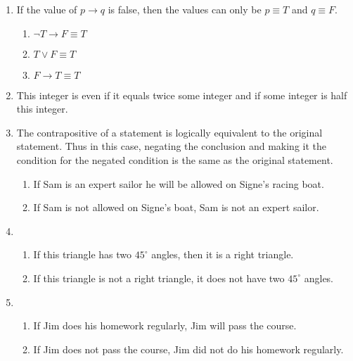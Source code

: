 \documentclass[12pt]{article}
\begin{document}
\begin{enumerate}
\begin{enumerate}
  \end{enumerate}

\setcounter{enumi}{20} %
\item
  If the value of $p \rightarrow q$ is false, then the values can only be $p \equiv T$ and $q \equiv F$.
  \begin{enumerate}
  \item $\neg T \rightarrow F \equiv T$
  \item $T \vee F \equiv T$
  \item $F \rightarrow T \equiv T$
  \end{enumerate}

\setcounter{enumi}{32} %
\item This integer is even if it equals twice some integer and if some integer is half this integer.
\setcounter{enumi}{34} %
\item
The contrapositive of a statement is logically equivalent to the original statement. Thus in this case, negating the conclusion and making it the condition for the negated condition is the same as the original statement.
  \begin{enumerate}
  \item If Sam is an expert sailor he will be allowed on Signe's racing boat.
  \item If Sam is not allowed on Signe's boat, Sam is not an expert sailor.
  \end{enumerate}

\setcounter{enumi}{40} %
\item
\begin{enumerate}
\item If this triangle has two $45^{\circ}$ angles, then it is a right triangle.
\item If this triangle is not a right triangle, it does not have two $45^{\circ}$ angles.
\end{enumerate}
\setcounter{enumi}{42} %
\item 

\begin{enumerate}
\item If Jim does his homework regularly, Jim will pass the course.
\item If Jim does not pass the course, Jim did not do his homework regularly.
\end{enumerate}

\end{enumerate}
\end{document}
